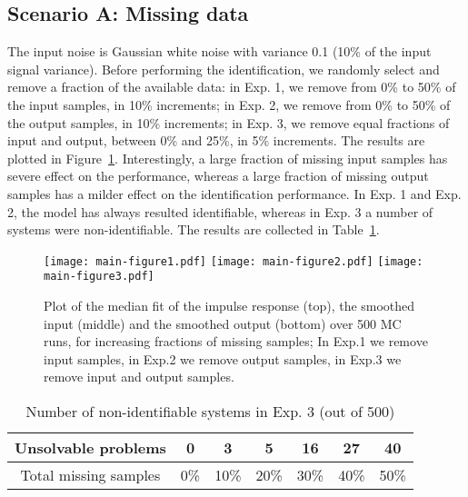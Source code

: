 \documentclass[10pt]{article}
\begin{document}
\subsection*{Scenario A\@: Missing data}
The input noise is Gaussian white noise with variance 0.1 (10\% of the input
signal variance). Before performing
the identification, we randomly select and remove a fraction of the available
data: in Exp. 1, we remove from 0\% to 50\% of the input samples, in 10\%
increments; in Exp. 2, we remove from 0\% to 50\% of the output samples,
in 10\% increments; in Exp. 3, we remove equal fractions of input and output,
between 0\% and 25\%, in 5\% increments.  The results are plotted in
Figure~\ref{fig:scenario_a}. Interestingly, a large fraction of missing input
samples has severe effect on the performance, whereas a large fraction of
missing output samples has a milder effect on the identification performance. In
Exp. 1 and Exp. 2, the model has always resulted identifiable, whereas in Exp. 3
a number of systems were non-identifiable. The results are collected in
Table~\ref{tab:unsolve}.
\begin{figure}[H]
  \centering
  \texttt{[image: main-figure1.pdf]}
  \texttt{[image: main-figure2.pdf]}
  \texttt{[image: main-figure3.pdf]}
  \caption{Plot of the median fit of the impulse response (top), the smoothed
    input (middle) and the smoothed output (bottom) over 500 MC runs, for increasing
    fractions of missing samples; In Exp.1  we remove input samples, in
    Exp.2  we remove output samples, in Exp.3  we remove input and
    output samples.
}\label{fig:scenario_a}
\end{figure}

\begin{table}[b]
  \centering
  \begin{tabular}{ccccccc}
    \toprule
    Unsolvable problems&     0  &   3  &  5 &  16 &  27 &  40\\
    \midrule
    Total missing samples & 0\% & 10\% & 20\% & 30\% & 40\% & 50\%\\
    \bottomrule
  \end{tabular}
  \caption{Number of non-identifiable systems in Exp. 3 (out of 500)}\label{tab:unsolve}
\end{table}
\end{document}
